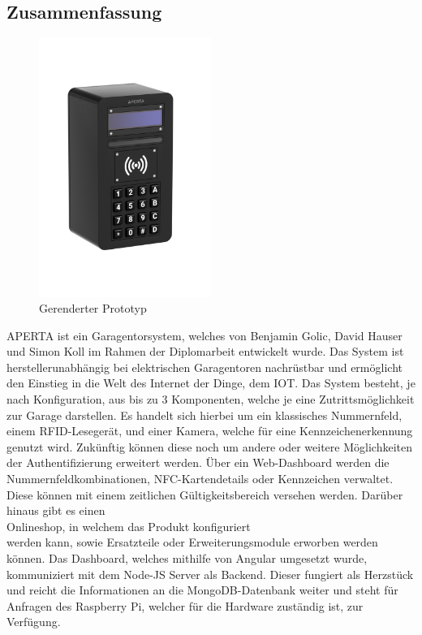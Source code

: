 \newpage

\begin{spacing}{1}
  \chapter*{Zusammenfassung}
\end{spacing}
\begin{figure}
  \begin{center}
    \includegraphics[width=0.5\textwidth]{pics/all-in-package.png}
    \caption{Gerenderter Prototyp}
  \end{center}
\end{figure}
APERTA ist ein Garagentorsystem, welches von Benjamin Golic, David Hauser und Simon Koll im Rahmen der Diplomarbeit entwickelt wurde. Das System ist herstellerunabhängig bei elektrischen Garagentoren nachrüstbar und ermöglicht den Einstieg in die Welt des Internet der Dinge, dem IOT. Das System besteht, je nach Konfiguration, aus bis zu 3 Komponenten, welche je eine Zutrittsmöglichkeit zur Garage darstellen. Es handelt sich hierbei um ein klassisches Nummernfeld, einem RFID-Lesegerät, und einer Kamera, welche für eine Kennzeichenerkennung genutzt wird. Zukünftig können diese noch um andere oder weitere Möglichkeiten der Authentifizierung erweitert werden. Über ein Web-Dashboard werden die Nummernfeldkombinationen, NFC-Kartendetails oder Kennzeichen verwaltet. Diese können mit einem zeitlichen Gültigkeitsbereich versehen werden. Darüber hinaus gibt es einen \\ Onlineshop, in welchem das Produkt konfiguriert \\ werden kann, sowie Ersatzteile oder Erweiterungsmodule erworben werden können. Das Dashboard, welches mithilfe von Angular umgesetzt wurde, kommuniziert mit dem Node-JS Server als Backend. Dieser fungiert als Herzstück und reicht die Informationen an die MongoDB-Datenbank weiter und steht für Anfragen des Raspberry Pi, welcher für die Hardware zuständig ist, zur Verfügung.